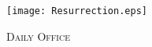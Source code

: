 \fancyhead[RE,LO]{}\fancyhead[RO,LE]{}
\fancyhead[C]{}\thispagestyle{empty}
{}
  \begin{center}
   \texttt{[image: Resurrection.eps]}
   \par
   \vspace{2ex}
   	\textsc{\Huge{Daily Office}}
   \end{center}